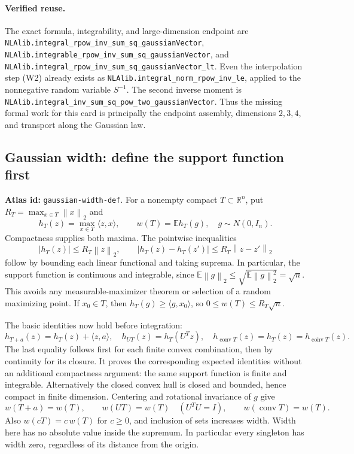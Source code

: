 \documentclass[11pt,a4paper]{article}
\newcommand{\R}{\mathbb R}
\newcommand{\norm}[1]{\left\lVert#1\right\rVert}
\DeclareRobustCommand{\code}[1]{{\footnotesize\urlstyle{tt}\nolinkurl{#1}}}
\begin{document}
\paragraph{Verified reuse.}
The exact formula, integrability, and large-dimension endpoint are
\code{NLAlib.integral_rpow_inv_sum_sq_gaussianVector},
\code{NLAlib.integrable_rpow_inv_sum_sq_gaussianVector}, and
\code{NLAlib.integral_rpow_inv_sum_sq_gaussianVector_lt}.
Even the interpolation step (W2) already exists as
\code{NLAlib.integral_norm_rpow_inv_le}, applied to the nonnegative random
variable $S^{-1}$. The second inverse moment is
\code{NLAlib.integral_inv_sum_sq_pow_two_gaussianVector}.
Thus the missing formal work for this card is principally the endpoint
assembly, dimensions $2,3,4$, and transport along the Gaussian law.

\subsection{Gaussian width: define the support function first}
\label{route:gaussian-width-def}
\textbf{Atlas id:} \code{gaussian-width-def}.
For a nonempty compact $T\subset\R^n$, put
$R_T=\max_{x\in T}\norm x_2$ and
\[
 h_T(z)=\max_{x\in T}\langle z,x\rangle,\qquad
 w(T)=\mathbb E h_T(g),\quad g\sim N(0,I_n).
\]
Compactness supplies both maxima. The pointwise inequalities
\[
 |h_T(z)|\le R_T\norm z_2,\qquad
 |h_T(z)-h_T(z')|\le R_T\norm{z-z'}_2                 \tag{W3}
\]
follow by bounding each linear functional and taking suprema. In particular,
the support function is continuous and integrable, since
$\mathbb E\norm g_2\le\sqrt{\mathbb E\norm g_2^2}=\sqrt n$.
This avoids any measurable-maximizer theorem or selection of a random
maximizing point. If $x_0\in T$, then $h_T(g)\ge\langle g,x_0\rangle$,
so $0\le w(T)\le R_T\sqrt n$.

The basic identities now hold before integration:
\[
 h_{T+a}(z)=h_T(z)+\langle z,a\rangle,\quad
 h_{UT}(z)=h_T(U^Tz),\quad
 h_{\operatorname{conv}T}(z)=h_T(z)
                     =h_{\overline{\operatorname{conv}}T}(z).    \tag{W4}
\]
The last equality follows first for each finite convex combination, then
by continuity for its closure. It proves the corresponding expected
identities without an additional compactness argument: the same support
function is finite and integrable. Alternatively the closed convex hull
is closed and bounded, hence compact in finite dimension.
Centering and rotational invariance of $g$ give
\[
 w(T+a)=w(T),\qquad w(UT)=w(T)\quad(U^TU=I),\qquad
 w(\operatorname{conv}T)=w(T).
\]
Also $w(cT)=c\,w(T)$ for $c\ge0$, and inclusion of sets increases width.
Width here has no absolute value inside the supremum. In particular every
singleton has width zero, regardless of its distance from the origin.
\end{document}
